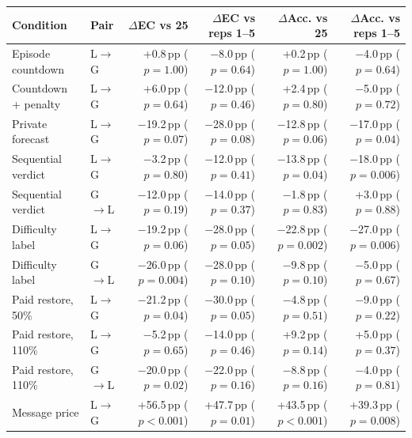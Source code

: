 \begin{tabular}{@{}llrrrr@{}}
\toprule
Condition & Pair & $\Delta$EC vs 25 & $\Delta$EC vs reps 1--5 & $\Delta$Acc. vs 25 & $\Delta$Acc. vs reps 1--5 \\
\midrule
Episode countdown & L$\to$G & +0.8\,pp ($p=1.00$) & $-$8.0\,pp ($p=0.64$) & +0.2\,pp ($p=1.00$) & $-$4.0\,pp ($p=0.64$) \\
Countdown + penalty & L$\to$G & +6.0\,pp ($p=0.64$) & $-$12.0\,pp ($p=0.46$) & +2.4\,pp ($p=0.80$) & $-$5.0\,pp ($p=0.72$) \\
Private forecast & L$\to$G & $-$19.2\,pp ($p=0.07$) & $-$28.0\,pp ($p=0.08$) & $-$12.8\,pp ($p=0.06$) & $-$17.0\,pp ($p=0.04$) \\
Sequential verdict & L$\to$G & $-$3.2\,pp ($p=0.80$) & $-$12.0\,pp ($p=0.41$) & $-$13.8\,pp ($p=0.04$) & $-$18.0\,pp ($p=0.006$) \\
Sequential verdict & G$\to$L & $-$12.0\,pp ($p=0.19$) & $-$14.0\,pp ($p=0.37$) & $-$1.8\,pp ($p=0.83$) & +3.0\,pp ($p=0.88$) \\
Difficulty label & L$\to$G & $-$19.2\,pp ($p=0.06$) & $-$28.0\,pp ($p=0.05$) & $-$22.8\,pp ($p=0.002$) & $-$27.0\,pp ($p=0.006$) \\
Difficulty label & G$\to$L & $-$26.0\,pp ($p=0.004$) & $-$28.0\,pp ($p=0.10$) & $-$9.8\,pp ($p=0.10$) & $-$5.0\,pp ($p=0.67$) \\
Paid restore, 50\% & L$\to$G & $-$21.2\,pp ($p=0.04$) & $-$30.0\,pp ($p=0.05$) & $-$4.8\,pp ($p=0.51$) & $-$9.0\,pp ($p=0.22$) \\
Paid restore, 110\% & L$\to$G & $-$5.2\,pp ($p=0.65$) & $-$14.0\,pp ($p=0.46$) & +9.2\,pp ($p=0.14$) & +5.0\,pp ($p=0.37$) \\
Paid restore, 110\% & G$\to$L & $-$20.0\,pp ($p=0.02$) & $-$22.0\,pp ($p=0.16$) & $-$8.8\,pp ($p=0.16$) & $-$4.0\,pp ($p=0.81$) \\
Message price & L$\to$G & +56.5\,pp ($p<0.001$) & +47.7\,pp ($p=0.01$) & +43.5\,pp ($p<0.001$) & +39.3\,pp ($p=0.008$) \\
\bottomrule
\end{tabular}
